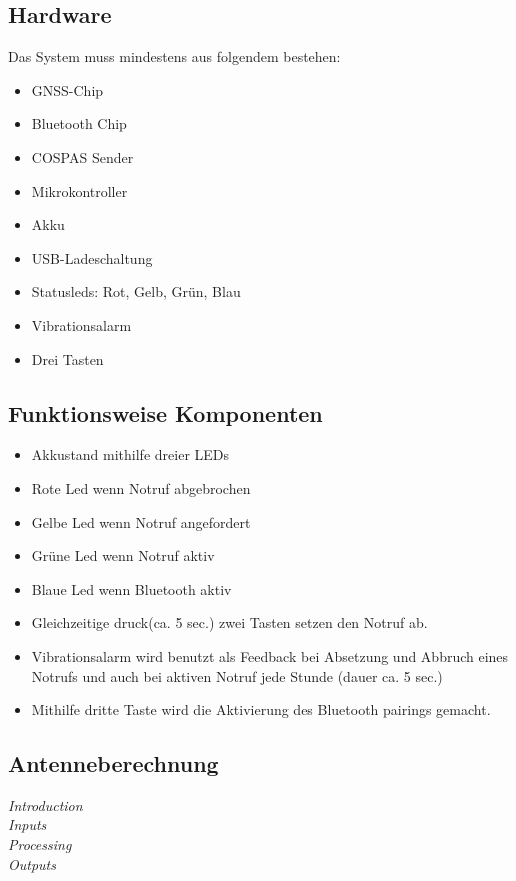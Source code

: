\subsection{Hardware}
Das System muss mindestens aus folgendem bestehen:
\begin{itemize}
	\item GNSS-Chip
	\item Bluetooth Chip
	\item COSPAS Sender
	\item Mikrokontroller
	\item Akku
	\item USB-Ladeschaltung
	\item Statusleds: Rot, Gelb, Grün, Blau 
	\item Vibrationsalarm
	\item Drei Tasten
\end{itemize}

\subsection{Funktionsweise Komponenten}
\begin{itemize}
	\item Akkustand mithilfe dreier LEDs
	\item Rote Led wenn Notruf abgebrochen
	\item Gelbe Led wenn Notruf angefordert
	\item Grüne Led wenn Notruf aktiv
	\item Blaue Led wenn Bluetooth aktiv
	\item Gleichzeitige druck(ca. 5 sec.) zwei Tasten setzen den Notruf ab.
	\item Vibrationsalarm wird benutzt als Feedback bei Absetzung und Abbruch eines Notrufs und auch bei aktiven Notruf jede Stunde (dauer ca. 5 sec.)
	\item Mithilfe dritte Taste wird die Aktivierung des Bluetooth pairings gemacht.
\end{itemize}
\subsection{Antenneberechnung}


\noindent \textit{\large Introduction} \\
\textit{\large Inputs} \\
\textit{\large Processing} \\
\textit{\large Outputs} \\

